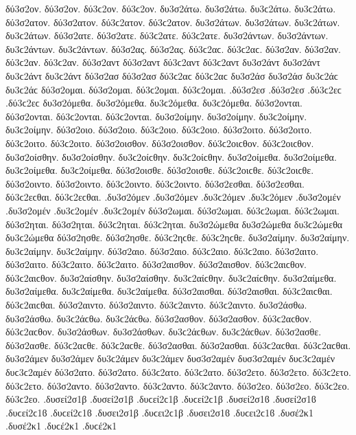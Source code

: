 {	%
δύ3σ2ον. δύ3σ2ον. δύ3ϲ2ον. δύ3ϲ2ον.
δυ3σ2άτω. δυ3σ2άτω. δυ3ϲ2άτω. δυ3ϲ2άτω.
δύ3σ2ατον. δύ3σ2ατον. δύ3ϲ2ατον. δύ3ϲ2ατον.
δυ3σ2άτων. δυ3σ2άτων. δυ3ϲ2άτων. δυ3ϲ2άτων.
δύ3σ2ατε. δύ3σ2ατε. δύ3ϲ2ατε. δύ3ϲ2ατε.
δυ3σ2άντων. δυ3σ2άντων. δυ3ϲ2άντων. δυ3ϲ2άντων.
δύ3σ2ας. δύ3σ2ας. δύ3ϲ2αϲ. δύ3ϲ2αϲ. δύ3σ2αν. δύ3σ2αν. δύ3ϲ2αν. δύ3ϲ2αν. δύ3σ2αντ δύ3σ2αντ δύ3ϲ2αντ δύ3ϲ2αντ δυ3σ2άντ δυ3σ2άντ δυ3ϲ2άντ δυ3ϲ2άντ
δύ3σ2ασ δύ3σ2ασ δύ3ϲ2αϲ δύ3ϲ2αϲ δυ3σ2άσ δυ3σ2άσ δυ3ϲ2άϲ δυ3ϲ2άϲ
δύ3σ2ομαι. δύ3σ2ομαι. δύ3ϲ2ομαι. δύ3ϲ2ομαι.
.δύ3σ2εσ .δύ3σ2εσ .δύ3ϲ2εϲ .δύ3ϲ2εϲ
δυ3σ2όμεθα. δυ3σ2όμεθα. δυ3ϲ2όμεθα. δυ3ϲ2όμεθα.
δύ3σ2ονται. δύ3σ2ονται. δύ3ϲ2ονται. δύ3ϲ2ονται.
δυ3σ2οίμην. δυ3σ2οίμην. δυ3ϲ2οίμην. δυ3ϲ2οίμην.
δύ3σ2οιο. δύ3σ2οιο. δύ3ϲ2οιο. δύ3ϲ2οιο.
δύ3σ2οιτο. δύ3σ2οιτο. δύ3ϲ2οιτο. δύ3ϲ2οιτο.
δύ3σ2οισθον. δύ3σ2οισθον. δύ3ϲ2οιϲθον. δύ3ϲ2οιϲθον.
δυ3σ2οίσθην. δυ3σ2οίσθην. δυ3ϲ2οίϲθην. δυ3ϲ2οίϲθην.
δυ3σ2οίμεθα. δυ3σ2οίμεθα. δυ3ϲ2οίμεθα. δυ3ϲ2οίμεθα.
δύ3σ2οισθε. δύ3σ2οισθε. δύ3ϲ2οιϲθε. δύ3ϲ2οιϲθε.
δύ3σ2οιντο. δύ3σ2οιντο. δύ3ϲ2οιντο. δύ3ϲ2οιντο.
δύ3σ2εσθαι. δύ3σ2εσθαι. δύ3ϲ2εϲθαι. δύ3ϲ2εϲθαι.
.δυ3σ2όμεν .δυ3σ2όμεν .δυ3ϲ2όμεν .δυ3ϲ2όμεν   %
.δυ3σ2ομέν .δυ3σ2ομέν .δυ3ϲ2ομέν .δυ3ϲ2ομέν
δύ3σ2ωμαι. δύ3σ2ωμαι. δύ3ϲ2ωμαι. δύ3ϲ2ωμαι.
δύ3σ2ηται. δύ3σ2ηται. δύ3ϲ2ηται. δύ3ϲ2ηται.
δυ3σ2ώμεθα δυ3σ2ώμεθα δυ3ϲ2ώμεθα δυ3ϲ2ώμεθα
δύ3σ2ησθε. δύ3σ2ησθε. δύ3ϲ2ηϲθε. δύ3ϲ2ηϲθε.
δυ3σ2αίμην. δυ3σ2αίμην. δυ3ϲ2αίμην. δυ3ϲ2αίμην.
δύ3σ2αιο. δύ3σ2αιο. δύ3ϲ2αιο. δύ3ϲ2αιο.
δύ3σ2αιτο. δύ3σ2αιτο. δύ3ϲ2αιτο. δύ3ϲ2αιτο.
δύ3σ2αισθον. δύ3σ2αισθον. δύ3ϲ2αιϲθον. δύ3ϲ2αιϲθον.
δυ3σ2αίσθην. δυ3σ2αίσθην. δυ3ϲ2αίϲθην. δυ3ϲ2αίϲθην.
δυ3σ2αίμεθα. δυ3σ2αίμεθα. δυ3ϲ2αίμεθα. δυ3ϲ2αίμεθα.
δύ3σ2αισθαι. δύ3σ2αισθαι. δύ3ϲ2αιϲθαι. δύ3ϲ2αιϲθαι.
δύ3σ2αιντο. δύ3σ2αιντο. δύ3ϲ2αιντο. δύ3ϲ2αιντο.
δυ3σ2άσθω. δυ3σ2άσθω. δυ3ϲ2άϲθω. δυ3ϲ2άϲθω.
δύ3σ2ασθον. δύ3σ2ασθον. δύ3ϲ2αϲθον. δύ3ϲ2αϲθον.
δυ3σ2άσθων. δυ3σ2άσθων. δυ3ϲ2άϲθων. δυ3ϲ2άϲθων.
δύ3σ2ασθε. δύ3σ2ασθε. δύ3ϲ2αϲθε. δύ3ϲ2αϲθε.
δύ3σ2ασθαι. δύ3σ2ασθαι. δύ3ϲ2αϲθαι. δύ3ϲ2αϲθαι.
δυ3σ2άμεν δυ3σ2άμεν δυ3ϲ2άμεν δυ3ϲ2άμεν   %
δυσ3σ2αμέν δυσ3σ2αμέν δυϲ3ϲ2αμέν δυϲ3ϲ2αμέν
δύ3σ2ατο. δύ3σ2ατο. δύ3ϲ2ατο. δύ3ϲ2ατο.   %
δύ3σ2ετο. δύ3σ2ετο. δύ3ϲ2ετο. δύ3ϲ2ετο.   %
δύ3σ2αντο. δύ3σ2αντο. δύ3ϲ2αντο. δύ3ϲ2αντο.   %
δύ3σ2εο. δύ3σ2εο. δύ3ϲ2εο. δύ3ϲ2εο.   %
.δυσεί2σ1β .δυσεί2σ1β .δυϲεί2ϲ1β .δυϲεί2ϲ1β .δυσεί2σ1ϐ .δυσεί2σ1ϐ .δυϲεί2ϲ1ϐ .δυϲεί2ϲ1ϐ %
.δυσει2σ1β .δυϲει2ϲ1β .δυσει2σ1ϐ .δυϲει2ϲ1ϐ
.δυσέ2κ1 .δυσέ2κ1 .δυϲέ2κ1 .δυϲέ2κ1   %
}
